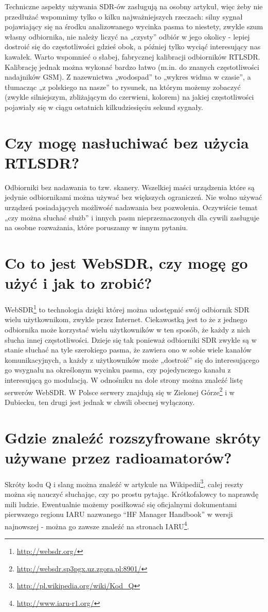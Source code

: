 \documentclass[a4paper,12pt]{article}
\begin{document}
Techniczne aspekty używania SDR-ów zasługują na osobny artykuł, więc żeby nie przedłużać wspomnimy tylko o kilku najważniejszych rzeczach: silny sygnał pojawiający się na środku analizowanego wycinka pasma to niestety, zwykle szum własny odbiornika, nie należy liczyć na „czysty” odbiór w jego okolicy - lepiej dostroić się do częstotliwości gdzieś obok, a później tylko wyciąć interesujący nas kawałek. Warto wspomnieć o słabej, fabrycznej kalibracji odbiorników RTLSDR. Kalibrację jednak można wykonać bardzo łatwo (m.in. do znanych częstotliwości nadajników GSM).
Z nazewnictwa „wodospad” to „wykres widma w czasie”, a tłumacząc „z polskiego na nasze” to rysunek, na którym możemy zobaczyć (zwykle silniejszym, zbliżającym do czerwieni, kolorem) na jakiej częstotliwości pojawiały się w ciągu ostatnich kilkudziesięciu sekund sygnały.

\section{Czy mogę nasłuchiwać bez użycia RTLSDR?}
Odbiorniki bez nadawania to tzw. skanery. Wszelkiej maści urządzenia które są jedynie odbiornikami można używać bez większych ograniczeń. Nie wolno używać urządzeń posiadających możliwość nadawania bez pozwolenia. Oczywiście temat „czy można słuchać służb” i innych pasm nieprzeznaczonych dla cywili zasługuje na osobne rozważania, które poruszamy w innym pytaniu.

\section{Co to jest WebSDR, czy mogę go użyć i jak to zrobić?}
WebSDR\footnote{\url{http://websdr.org/}} to technologia dzięki której można udostępnić swój odbiornik SDR wielu użytkownikom, zwykle przez Internet. Ciekawostką jest to że z jednego odbiornika może korzystać wielu użytkowników w ten sposób, że każdy z nich słucha innej częstotliwości. Dzieje się tak ponieważ odbiorniki SDR zwykle są w stanie słuchać na tyle szerokiego pasma, że zawiera ono w sobie wiele kanałów komunikacyjnych, a każdy z użytkowników może „dostroić” się do interesującego go wsygnału na określonym wycinku pasma, czy pojedynczego kanału z interesującą go modulacją. W odnośniku na dole strony można znaleźć listę serwerów WebSDR. W Polsce serwery znajdują się w Zielonej Górze\footnote{\url{http://websdr.sp3pgx.uz.zgora.pl:8901/}} i w Dubiecku, ten drugi jest jednak w chwili obecnej wyłączony.


\section{Gdzie znaleźć rozszyfrowane skróty używane przez radioamatorów?}
Skróty kodu Q i slang można znaleźć w artykule na Wikipedii\footnote{\url{http://pl.wikipedia.org/wiki/Kod_Q}}, całej reszty można się nauczyć słuchając, czy po prostu pytając. Krótkofalowcy to naprawdę mili ludzie. Ewentualnie możemy posiłkować się oficjalnymi dokumentami pierwszego regionu IARU nazwanego “HF Manager Handbook” w wersji najnowszej - można go zawsze znaleźć na stronach IARU\footnote{\url{http://www.iaru-r1.org/}}.
\end{document}
